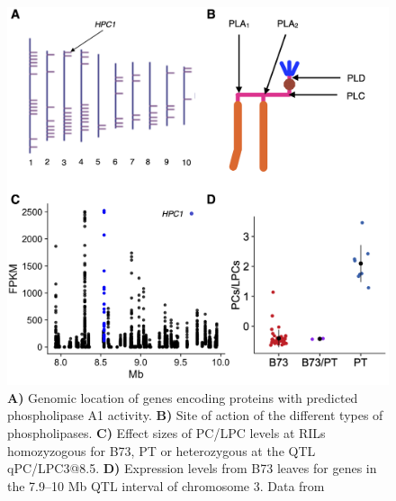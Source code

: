 \documentclass[9pt,twocolumn,twoside,lineno]{biorxiv}
\begin{document}
\clearpage

\begin{figure}[t]
\begin{center}
\includegraphics[width=0.6\paperwidth]{Sup_Figures/Sup_Fig_3.png}
\caption{\textbf{A)} Genomic location of genes encoding proteins with predicted phospholipase A1 activity. 
\textbf{B)} Site of action of the different types of phospholipases.
\textbf{C)} Effect sizes of PC/LPC levels at RILs homozyzogous for B73, PT or heterozygous at the QTL qPC/LPC3@8.5.
\textbf{D)} Expression levels from B73 leaves for genes in the 7.9--10 Mb QTL interval of chromosome 3. Data from \cite{Stelpflug2016-vr}
}
\label{figure::Sup:HPC1_misc}
\end{center}
\end{figure} 

\clearpage
\end{document}
